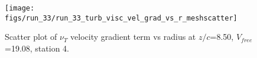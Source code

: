 \begin{figure}[H]
\centering
\texttt{[image: figs/run\_33/run\_33\_turb\_visc\_vel\_grad\_vs\_r\_meshscatter]}
\caption{Scatter plot of $\nu_T$ velocity gradient term vs radius at $z/c$=8.50, $V_{free}$=19.08, station 4.}
\label{fig:run_33_turb_visc_vel_grad_vs_r_meshscatter}
\end{figure}


